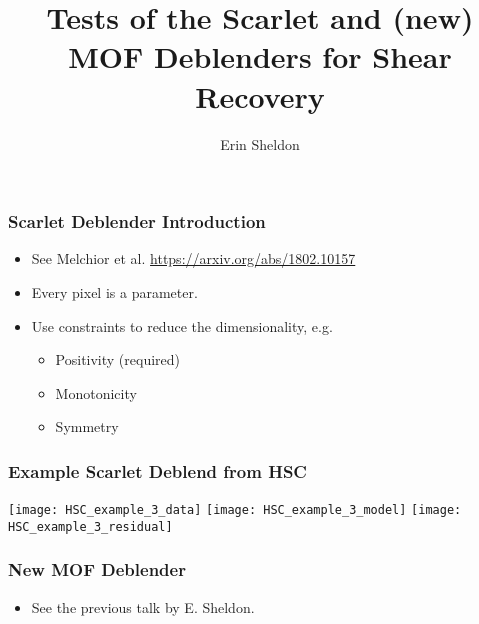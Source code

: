 \documentclass{beamer}
\title{Tests of the Scarlet and (new) MOF Deblenders for Shear Recovery}
\author{Erin Sheldon}
\institute{Brookhaven National Laboratory}
\begin{document}
\frame{\titlepage}



\frame
{
    \frametitle{Scarlet Deblender Introduction}

    \begin{itemize}

        \item See Melchior et al. \url{https://arxiv.org/abs/1802.10157 }

        \item Every pixel is a parameter.
        \item Use constraints to reduce the dimensionality, e.g.
        \begin{itemize}
            \item Positivity (required)
            \item Monotonicity
            \item Symmetry
        \end{itemize}

    \end{itemize}

}

\frame
{

    \frametitle{Example Scarlet Deblend from HSC}


    \begin{center}
    \texttt{[image: HSC\_example\_3\_data]}
    \texttt{[image: HSC\_example\_3\_model]}
    \texttt{[image: HSC\_example\_3\_residual]}
    \end{center}


}

\frame
{
    \frametitle{New MOF Deblender}

    \begin{itemize}

        \item See the previous talk by E. Sheldon.

    \end{itemize}

}
\end{document}
